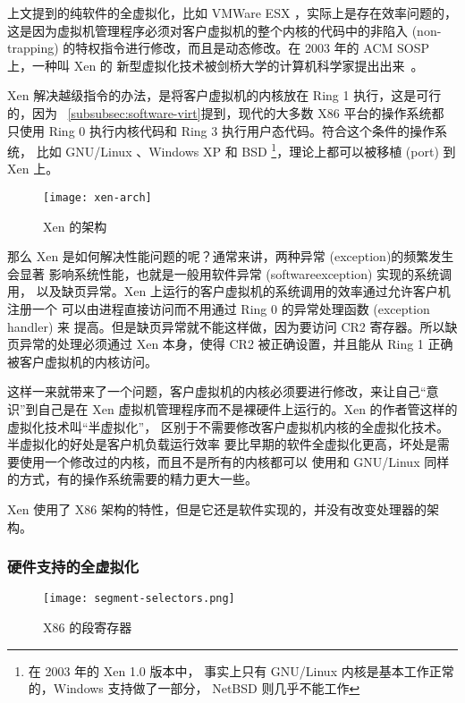 上文提到的纯软件的全虚拟化，比如 VMWare ESX ，实际上是存在效率问题的，
这是因为虚拟机管理程序必须对客户虚拟机的整个内核的代码中的非陷入 (non-trapping)
的特权指令进行修改，而且是动态修改。在 2003 年的 ACM SOSP 上，一种叫 Xen 的
新型虚拟化技术被剑桥大学的计算机科学家提出出来~\cite{barham2003xen}。

Xen 解决越级指令的办法，是将客户虚拟机的内核放在 Ring 1 执行，这是可行的，因为
~\ref{subsubsec:software-virt}提到，现代的大多数 X86 平台的操作系统都
只使用 Ring 0 执行内核代码和 Ring 3 执行用户态代码。符合这个条件的操作系统，
比如 GNU/Linux 、Windows XP 和 BSD \footnote{在 2003 年的 Xen 1.0 版本中，
事实上只有 GNU/Linux 内核是基本工作正常的，Windows 支持做了一部分，
NetBSD 则几乎不能工作}，理论上都可以被移植 (port) 到 Xen 上。

\begin{figure}[h]
    \centering
    \texttt{[image: xen-arch]}
    \caption{Xen 的架构}
\end{figure}

那么 Xen 是如何解决性能问题的呢？通常来讲，两种异常 (exception)的频繁发生会显著
影响系统性能，也就是一般用软件异常 (softwareexception) 实现的系统调用，
以及缺页异常。Xen 上运行的客户虚拟机的系统调用的效率通过允许客户机注册一个
可以由进程直接访问而不用通过 Ring 0 的异常处理函数 (exception handler) 来
提高。但是缺页异常就不能这样做，因为要访问 CR2 寄存器。所以缺页异常的处理必须通过
Xen 本身，使得 CR2 被正确设置，并且能从 Ring 1 正确被客户虚拟机的内核访问。

这样一来就带来了一个问题，客户虚拟机的内核必须要进行修改，来让自己“意识”到自己是在
Xen 虚拟机管理程序而不是裸硬件上运行的。Xen 的作者管这样的虚拟化技术叫“半虚拟化”，
区别于不需要修改客户虚拟机内核的全虚拟化技术。半虚拟化的好处是客户机负载运行效率
要比早期的软件全虚拟化更高，坏处是需要使用一个修改过的内核，而且不是所有的内核都可以
使用和 GNU/Linux 同样的方式，有的操作系统需要的精力更大一些。

Xen 使用了 X86 架构的特性，但是它还是软件实现的，并没有改变处理器的架构。

\subsubsection{硬件支持的全虚拟化}
\label{subsubsec:hardware-virt}

\begin{figure}[h]
    \centering
    \texttt{[image: segment-selectors.png]}
    \caption{X86 的段寄存器}
\end{figure}

